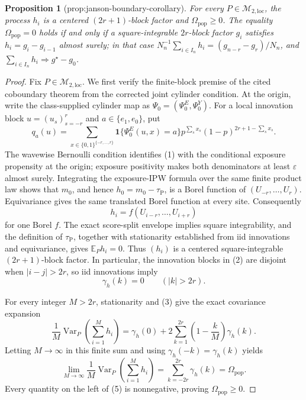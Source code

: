 \documentclass{article}
\newtheorem{proposition}{Proposition}
\begin{document}
\begin{proposition}[prop:janson-boundary-corollary]\label{prop:janson-boundary-corollary}
For every \(P\in\mathcal M_{2,\mathrm{loc}}\), the process \(h_i\) is a centered \((2r+1)\)-block factor and \(\Omega_{\mathrm{pop}}\ge0\). The equality \(\Omega_{\mathrm{pop}}=0\) holds if and only if a square-integrable \(2r\)-block factor \(g_i\) satisfies \(h_i=g_i-g_{i-1}\) almost surely; in that case \(N_n^{-1}\sum_{i\in I_n}h_i=(g_{n-r}-g_r)/N_n\), and \(\sum_{i\in I_n}h_i\Rightarrow g^\star-g_0\).
\end{proposition}
\begin{proof}
Fix \(P\in\mathcal M_{2,\mathrm{loc}}\).  We first verify the finite-block premise of the cited coboundary theorem from the corrected joint cylinder condition.  At the origin, write the class-supplied cylinder map as \(\Psi_0=(\Psi_0^E,\Psi_0^Y)\).  For a local innovation block \(u=(u_s)_{s=-r}^r\) and \(a\in\{e_1,e_0\}\), put
\[
 q_a(u)=
 \sum_{x\in\{0,1\}^{\{-r,\ldots,r\}}}
 \mathbf 1\{\Psi_0^E(u,x)=a\}
 p^{\sum_sx_s}(1-p)^{2r+1-\sum_sx_s}. \tag{1}
\]
The wavewise Bernoulli condition identifies (1) with the conditional exposure propensity at the origin; exposure positivity makes both denominators at least \(\varepsilon\) almost surely.  Integrating the exposure-IPW formula over the same finite product law shows that \(m_0\), and hence \(h_0=m_0-\tau_{\mathrm P}\), is a Borel function of \((U_{-r},\ldots,U_r)\).  Equivariance gives the same translated Borel function at every site.  Consequently
\[
 h_i=f(U_{i-r},\ldots,U_{i+r}) \tag{2}
\]
for one Borel \(f\).  The exact score-split envelope implies square integrability, and the definition of \(\tau_{\mathrm P}\), together with stationarity established from iid innovations and equivariance, gives \(\mathbb E_Ph_i=0\).  Thus \((h_i)\) is a centered square-integrable \((2r+1)\)-block factor.  In particular, the innovation blocks in (2) are disjoint when \(|i-j|>2r\), so iid innovations imply
\[
 \gamma_h(k)=0\qquad(|k|>2r). \tag{3}
\]

For every integer \(M>2r\), stationarity and (3) give the exact covariance expansion
\[
 \frac1M\operatorname{Var}_P\!\left(\sum_{i=1}^Mh_i\right)
 =\gamma_h(0)+2\sum_{k=1}^{2r}
 \left(1-\frac{k}{M}\right)\gamma_h(k). \tag{4}
\]
Letting \(M\to\infty\) in this finite sum and using \(\gamma_h(-k)=\gamma_h(k)\) yields
\[
 \lim_{M\to\infty}\frac1M
 \operatorname{Var}_P\!\left(\sum_{i=1}^Mh_i\right)
 =\sum_{k=-2r}^{2r}\gamma_h(k)
 =\Omega_{\mathrm{pop}}. \tag{5}
\]
Every quantity on the left of (5) is nonnegative, proving \(\Omega_{\mathrm{pop}}\ge0\).


\end{proof}
\end{document}
